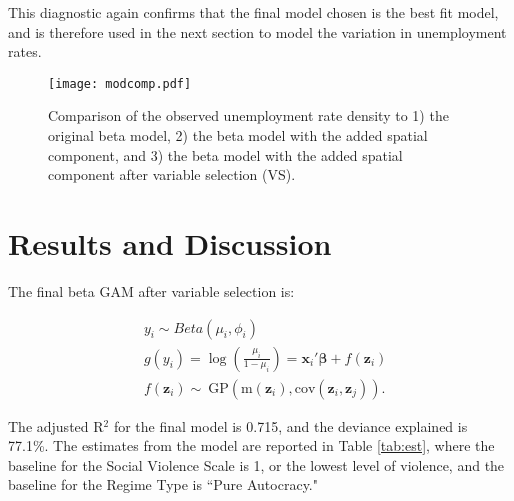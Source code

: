 \documentclass[letterpaper,11pt]{article}
\begin{document}
This diagnostic again confirms that the final model chosen is the best fit model, and is therefore used in the next section to model the variation in unemployment rates. 

\begin{figure}
\centering
\texttt{[image: modcomp.pdf]}
\caption{Comparison of the observed unemployment rate density to 1) the original beta model, 2) the beta model with the added spatial component, and 3) the beta model with the added spatial component after variable selection (VS).}
\label{fig:modcomp}
\end{figure}

\section{Results and Discussion}

The final beta GAM after variable selection is:

\begin{equation}
\begin{aligned}
         &y_i \sim Beta(\mu_i,\phi_i) \\
          &g(y_i) = \log \left(\frac{\mu_i}{1-\mu_i}\right) = \mathbf{x}_i'\boldsymbol{\beta}+f(\mathbf{z}_i) \\
          &f(\mathbf{z}_i) \sim\ \text{GP}(\text{m}(\mathbf{z}_i),\text{cov}(\mathbf{z}_i,\mathbf{z}_j)).
    \end{aligned}
\end{equation}

The adjusted R$^2$ for the final model is 0.715, and the deviance explained is 77.1\%. The estimates from the model are reported in Table \ref{tab:est}, where the baseline for the Social Violence Scale is 1, or the lowest level of violence, and the baseline for the Regime Type is ``Pure Autocracy."  
\end{document}
